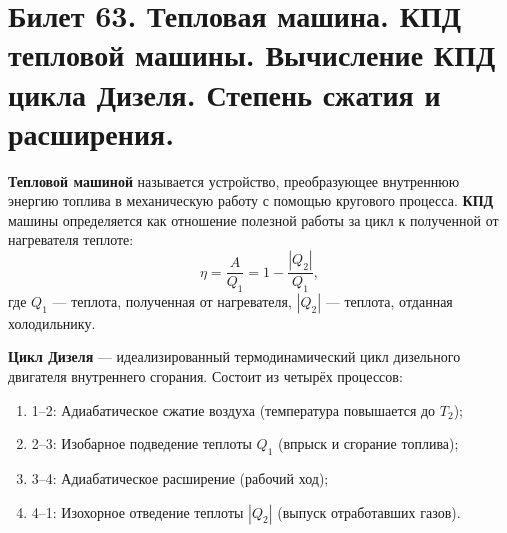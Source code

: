 \section{Билет 63. Тепловая машина. КПД тепловой машины. Вычисление КПД цикла Дизеля. Степень сжатия и расширения.}

\begin{definition}
\textbf{Тепловой машиной} называется устройство, преобразующее внутреннюю энергию топлива в механическую работу с помощью кругового процесса. \textbf{КПД} машины определяется как отношение полезной работы за цикл к полученной от нагревателя теплоте:
\begin{equation}
    \eta = \frac{A}{Q_1} = 1 - \frac{|Q_2|}{Q_1},
\end{equation}
где $Q_1$ --- теплота, полученная от нагревателя, $|Q_2|$ --- теплота, отданная холодильнику.
\end{definition}

\begin{definition}
\textbf{Цикл Дизеля} --- идеализированный термодинамический цикл дизельного двигателя внутреннего сгорания. Состоит из четырёх процессов:
\begin{enumerate}
    \item 1--2: Адиабатическое сжатие воздуха (температура повышается до $T_2$);
    \item 2--3: Изобарное подведение теплоты $Q_1$ (впрыск и сгорание топлива);
    \item 3--4: Адиабатическое расширение (рабочий ход);
    \item 4--1: Изохорное отведение теплоты $|Q_2|$ (выпуск отработавших газов).
\end{enumerate}
\end{definition}

